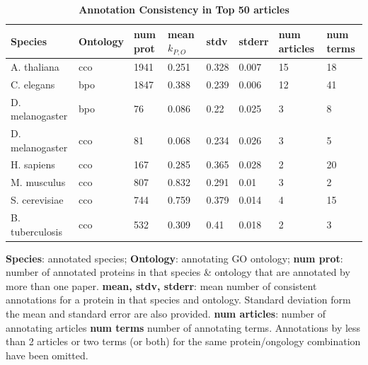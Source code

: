 \documentclass[12pt]{article}
\begin{document}
\begin{table}[!ht]
\caption{
\bf{Annotation Consistency in Top 50 articles}}
\begin{tabular}{|p{3cm}|l|l|l|l|l|l|l|}
\hline
\textbf{Species} & \textbf{Ontology} & \textbf{num prot} & \textbf{mean} 
$k_{P,O}$ &
\textbf{stdv} & \textbf{stderr} & \textbf{num articles} & \textbf{num terms} \\
\hline \hline
A. thaliana & cco & 1941 & 0.251 & 0.328 & 0.007 & 15 & 18\\ \hline\hline
C. elegans & bpo & 1847 & 0.388 & 0.239 & 0.006 & 12 & 41\\ \hline 
D. melanogaster & bpo & 76 & 0.086 & 0.22 & 0.025 & 3 & 8\\ \hline
D. melanogaster & cco & 81 & 0.068 & 0.234 & 0.026 & 3 & 5\\ \hline\hline
H. sapiens & cco & 167 & 0.285 & 0.365 & 0.028 & 2 & 20\\ \hline\hline
M. musculus & cco & 807 & 0.832 & 0.291 & 0.01 & 3 & 2\\ \hline\hline
S. cerevisiae & cco & 744 & 0.759 & 0.379 & 0.014 & 4 & 15\\ \hline\hline
B. tuberculosis & cco & 532 & 0.309 & 0.41 & 0.018 & 2 & 3\\ \hline\hline
\end{tabular}
\begin{flushleft}
\textbf{Species}: annotated species;
\textbf{Ontology}: annotating GO ontology;
\textbf{num prot}: number of annotated proteins in that species \& ontology that are annotated by
more than one paper.
\textbf{mean, stdv, stderr}: mean number of consistent annotations for a protein in that species
and ontology. Standard deviation form the mean and standard error are also provided.
\textbf{num articles}: number of annotating articles
\textbf{num terms} number of annotating terms. 
Annotations by less than 2 articles or two terms (or both) for the same protein/ongology
combination have been omitted.
\end{flushleft}
\label{tab:dreamcatcher2}
\end{table}
\end{document}
